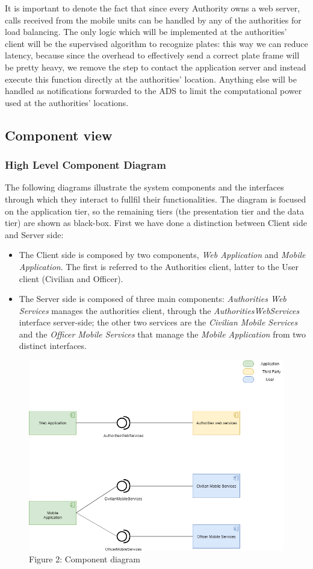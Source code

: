 \documentclass[12pt,a4paper]{article}
\begin{document}
It is important to denote the fact that since every Authority owns a web server, calls received from the mobile units can be handled by any of the authorities for load balancing. The only logic which will be implemented at the authorities' client will be the supervised algorithm to recognize plates: this way
we can reduce latency, because since the overhead to effectively send a correct plate frame will be pretty heavy, we remove the step to contact the application server and instead execute this function directly at the authorities' location. Anything else will be handled as notifications forwarded to the ADS
to limit the computational power used at the authorities' locations.


\subsection{Component view}
\subsubsection{High Level Component Diagram}
The following diagrams illustrate the system components and the interfaces through which they interact to fullfil their functionalities. The diagram is focused on the application tier, so the remaining tiers (the presentation tier and the data tier) are shown as black-box.
First we have done a distinction between Client side and Server side:
\begin{itemize}
\item The Client side is composed by two components, \textit{Web Application} and \textit{Mobile Application}. The first is referred to the Authorities client, latter to the User client (Civilian and Officer).
\item The Server side is composed of three main components: \textit{Authorities Web Services} manages the authorities client, through the \textit{AuthoritiesWebServices} interface server-side; the other two services are the \textit{Civilian Mobile Services} and the \textit{Officer Mobile Services} that manage  the \textit{Mobile Application} from two distinct interfaces.
\end{itemize}
\begin{figure}[H]
		\centering
			\includegraphics[width=1.0\linewidth]{Images/ComponentDiagram}
		\caption{Figure 2: Component diagram}
\end{figure}
\end{document}
